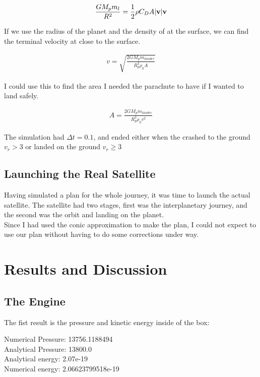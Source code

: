 \documentclass[a4paper, 10pt]{article}
\begin{document}
\begin{align}
\frac{GM_p m_l}{R^2} = \frac{1}{2}\rho C_D A |\bold{v}| \bold{v}
\end{align}

If we use the radius of the planet and the density of at the surface, we can find the terminal velocity at close to the surface.

\begin{align}
v = \sqrt{\frac{2GM_p m_{lander}}{R_p^2 \rho_0 A}}
\end{align}

I could use this to find the area I needed the parachute to have if I wanted to land safely. 

\begin{align}
A = \frac{2GM_p m_{lander}}{R_p^2 \rho_0 v^2}
\end{align}

The simulation had $\Delta t = 0.1$, and ended either when the crashed to the ground $v_r > 3$ or landed on the ground $v_r \geq 3$


\subsection{Launching the Real Satellite}
Having simulated a plan for the whole journey, it was time to launch the actual satellite. The satellite had two stages, first was the interplanetary journey, and the second was the orbit and landing on the planet.\\

Since I had used the conic approximation to make the plan, I could not expect to use our plan without having to do some corrections under way. 




\section{Results and Discussion}

\subsection{The Engine}

The fist result is the pressure and kinetic energy inside of the box:
\begin{tcolorbox}
Numerical Pressure:  13756.1188494 \\
Analytical Pressure:  13800.0 \\
Analytical energy:  2.07e-19 \\
Numerical energy:  2.06623799518e-19 
\end{tcolorbox}
\end{document}
